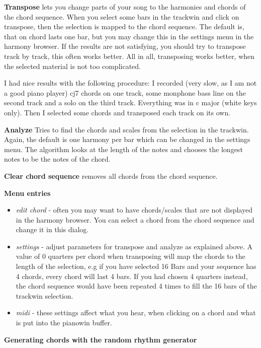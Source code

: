 \documentclass[letterpaper]{report}
\begin{document}
{\bf Transpose} lets you change parts of your song to the harmonies and chords
of the chord sequence. When you select some bars in the trackwin and
click on transpose, then the selection is mapped to the chord sequence.
The default is, that on chord lasts one bar, but you may change this in the
settings menu in the harmony browser. If the results are not satisfying, you
should try to transpose track by track, this often works better. All in all,
transposing works better, when the selected material is not too complicated.

I had nice results with the following procedure: I recorded (very slow, as I am
not a good piano player) cj7 chords on one track, some monphone bass line on the
second track and a solo on the third track. Everything was in c major (white keys
only). Then I selected some chords and transposed each track on its own.

{\bf Analyze} Tries to find the chords and scales from the selection in the
trackwin. Again, the default is one harmony per bar which can be changed in the
settings menu. The algorithm looks at the length of the notes and chooses the
longest notes to be the notes of the chord.

{\bf Clear chord sequence} removes all chords from the chord sequence.


{\bf Menu entries}

\begin{itemize}
\item {\em edit chord} - often you may want to have chords/scales that are not displayed
in the harmony browser. You can select a chord from the chord sequence and change
it in this dialog.

\item {\em settings} - adjust parameters for transpose and analyze as explained above.
A value of 0 quarters per chord when transposing will map the chords to the length
of the selection, e.g if you have selected 16 Bars and your sequence has 4 chords,
every chord will last 4 bars. If you had chosen 4 quarters instead, the chord
sequence would have been repeated 4 times to fill the 16 bars of the trackwin selection.

\item {\em midi} - these settings affect what you hear, when clicking on a chord and what
is put into the pianowin buffer.

\end{itemize}

{\bf Generating chords with the random rhythm generator}
\end{document}
